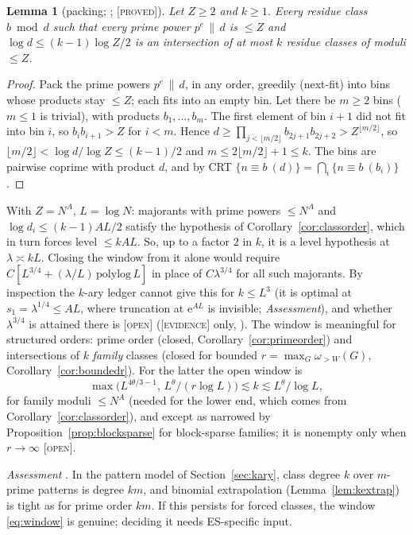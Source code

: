 \documentclass[10pt,reqno]{amsart}
\newtheorem{lemma}[theorem]{Lemma}
\theoremstyle{definition}
\theoremstyle{remark}
\newcommand{\e}{\mathrm e}
\newcommand{\lab}[1]{\textup{[\textsc{#1}]}}
\begin{document}
\begin{lemma}[packing; {\cite[Lemma~7.2]{KA3}}; \lab{proved}]\label{lem:packing}
Let $Z\geq2$ and $k\geq1$.  Every residue class $b\bmod d$ such that every
prime power $p^e\,\|\,d$ is $\leq Z$ and $\log d\leq(k-1)\log Z/2$ is an
intersection of at most $k$ residue classes of moduli $\leq Z$.
\end{lemma}
\begin{proof}
Pack the prime powers $p^e\,\|\,d$, in any order, greedily (next-fit) into
bins whose products stay $\leq Z$; each fits into an empty bin.  Let there
be $m\geq2$ bins ($m\leq1$ is trivial), with products $b_1,\dots,b_m$.  The first
element of bin $i+1$ did not fit into bin $i$, so $b_ib_{i+1}>Z$ for $i<m$.
Hence $d\geq\prod_{j<\lfloor m/2\rfloor}b_{2j+1}b_{2j+2}>Z^{\lfloor m/2\rfloor}$, so
$\lfloor m/2\rfloor<\log d/\log Z\leq(k-1)/2$ and $m\leq2\lfloor m/2\rfloor+1\leq k$.  The bins are
pairwise coprime with product $d$, and by CRT
$\{n\equiv b\ (d)\}=\bigcap_i\{n\equiv b\ (b_i)\}$.
\end{proof}
With $Z=N^A$, $L=\log N$: majorants with prime powers $\leq N^A$ and
$\log d_i\leq(k-1)AL/2$ satisfy the hypothesis of Corollary~\ref{cor:classorder},
which in turn forces level $\leq kAL$.  So, up to a factor $2$ in $k$, it is a
level hypothesis at $\lambda\asymp kL$.  Closing the window from it alone would
require $C[L^{3/4}+(\lambda/L)\,\mathrm{polylog}\,L]$ in place of $C\lambda^{3/4}$ for all such
majorants.  By inspection the $k$-ary ledger cannot give this for $k\leq L^3$
(it is optimal at $s_1=\lambda^{1/4}\leq AL$, where truncation at $\e^{AL}$ is
invisible; \emph{Assessment}), and whether
$\lambda^{3/4}$ is attained there is \lab{open} (\lab{evidence} only, \cite[\S2.5]{ET}).
The window is meaningful for structured orders: prime order (closed,
Corollary~\ref{cor:primeorder}) and intersections of $k$ \emph{family}
classes (closed for bounded $r=\max_G\omega_{>W}(G)$, Corollary~\ref{cor:boundedr}).
For the latter the open window is
\begin{equation}\label{eq:window}
 \max\bigl(L^{4\theta/3-1},\,L^\theta/(r\log L)\bigr)\lesssim k\lesssim L^\theta/\log L,
\end{equation}
for family moduli $\leq N^A$ (needed for the lower end, which comes from
Corollary~\ref{cor:classorder}), and except as narrowed by
Proposition~\ref{prop:blocksparse} for block-sparse families; it is
nonempty only when $r\to\infty$ \cite[\S5]{KA3} \lab{open}.

\emph{Assessment} \cite[\S7]{KA3}.  In the pattern model of
Section~\ref{sec:kary}, class degree $k$ over $m$-prime patterns is degree $km$,
and binomial extrapolation (Lemma~\ref{lem:kextrap}) is tight as for prime
order $km$.  If this persists for forced classes, the window
\eqref{eq:window} is genuine; deciding it needs ES-specific input.
\end{document}
